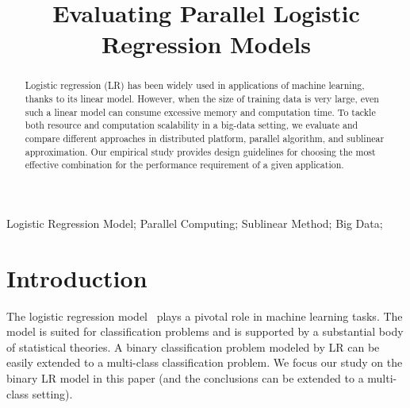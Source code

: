 \documentclass[10pt, conference, compsocconf]{IEEEtran}
\begin{document}
\title{Evaluating Parallel Logistic Regression Models}

\author{
\and
{}
\and
{}
}

\maketitle

\begin{abstract}
Logistic regression (LR)  has been widely used in applications of machine learning, thanks to its linear model.
However, when the size of training data is very large, even such a linear model can consume excessive memory and computation time.  To tackle both resource and computation scalability in a big-data setting, we evaluate and compare different approaches in distributed platform, parallel algorithm, and sublinear approximation.  Our empirical study provides design guidelines for choosing the most effective combination for the performance requirement of a given application.
\end{abstract}

\begin{IEEEkeywords}
Logistic Regression Model; Parallel Computing; Sublinear Method; Big Data;
\end{IEEEkeywords}

\section{Introduction} \label{sec:int}
The logistic regression model~\cite{HastieBook:SL} plays a pivotal role in machine learning tasks.
The model is suited for classification problems and is supported by a substantial body of statistical theories.
A binary classification problem modeled by LR can be easily extended to a multi-class classification problem.
We focus our study on the binary LR model in this paper (and the conclusions can be extended to a multi-class setting).
\end{document}
